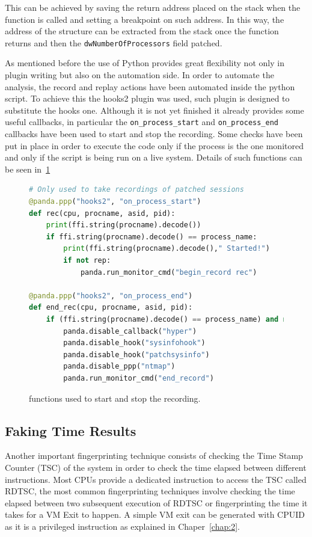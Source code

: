 This can be achieved by saving the return address placed on the stack when the function is called and setting a breakpoint on such address. In this way, the address of the structure can be extracted from the stack once the function returns and then the \lstinline{dwNumberOfProcessors} field patched.  


As mentioned before the use of Python provides great flexibility not only in plugin writing but also on the automation side. In order to automate the analysis, the record and replay actions have been automated inside the python script. To achieve this the hooks2 plugin was used, such plugin is designed to substitute the hooks one. Although it is not yet finished it already provides some useful callbacks, in particular the \lstinline{on_process_start} and \lstinline{on_process_end} callbacks have been used to start and stop the recording. Some checks have been put in place in order to execute the code only if the process is the one monitored and only if the script is being run on a live system. Details of such functions can be seen in~\ref{fig:startstop}

\begin{figure}[htp]
\centering
\begin{lstlisting}[language=Python] 
# Only used to take recordings of patched sessions
@panda.ppp("hooks2", "on_process_start")
def rec(cpu, procname, asid, pid):
    print(ffi.string(procname).decode())
    if ffi.string(procname).decode() == process_name:
        print(ffi.string(procname).decode()," Started!")
        if not rep:
            panda.run_monitor_cmd("begin_record rec")

@panda.ppp("hooks2", "on_process_end")
def end_rec(cpu, procname, asid, pid):
    if (ffi.string(procname).decode() == process_name) and not rep:
        panda.disable_callback("hyper")
        panda.disable_hook("sysinfohook")
        panda.disable_hook("patchsysinfo")
        panda.disable_ppp("ntmap")
        panda.run_monitor_cmd("end_record")
\end{lstlisting}
\caption{functions used to start and stop the recording.}
\label{fig:startstop}
\end{figure}


\subsection{Faking Time Results}

Another important fingerprinting technique consists of checking the Time Stamp Counter (TSC) of the system in order to check the time elapsed between different instructions. Most CPUs provide a dedicated instruction to access the TSC called RDTSC, the most common fingerprinting techniques involve checking the time elapsed between two subsequent execution of RDTSC or fingerprinting the time it takes for a VM Exit to happen. A simple VM exit can be generated with CPUID as it is a privileged instruction as explained in Chaper~\ref{chap:2}.

